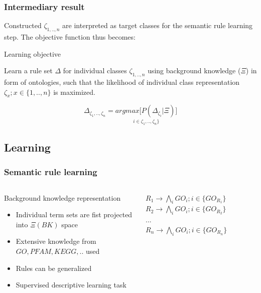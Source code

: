 \documentclass{beamer}
\begin{document}
\begin{frame}\frametitle{Intermediary result}

 Constructed $\zeta_{1,..,n}$  are interpreted as target classes for the semantic rule learning step. The objective function thus becomes:

  \begin{alertblock}{Learning objective}

    Learn a rule set $\Delta$  for individual classes $\zeta_{1,..,n}$ using background knowledge ($\Xi$) in form of ontologies, such that the likelihood of individual class representation $\zeta_{x};x \in \{1,..,n\}$ is maximized.

    \begin{equation}
      \Delta_{\zeta_{1},..,\zeta_{n}} = \underset{i \in \zeta_{1},..,\zeta_{n}\}}{argmax \Big[P(
        \Delta_{\zeta_{i}}|\Xi) \Big]}
    \end{equation}
    
    \end{alertblock}
  
  \end{frame}
  \subsection{Learning}
  \begin{frame}\frametitle{Semantic rule learning}

      \begin{columns}
    \begin{column}{0.5\textwidth}

  \begin{block}{Background knowledge representation}
    \begin{itemize}

    \item Individual term sets are fist projected into $\Xi(BK)$ space
    \item Extensive knowledge from $GO,PFAM, KEGG,..$ used
    \item Rules can be generalized
    \item Supervised descriptive learning task
      
    \end{itemize}
  \end{block}
      \end{column}
      \begin{column}{0.5\textwidth}  %
      \begin{center}
        $R_{1} \rightarrow \bigwedge_{i}GO_{i}; i \in \{GO_{R_{1}}\}$
        $R_{2} \rightarrow \bigwedge_{i}GO_{i}; i \in \{GO_{R_{2}}\}$\\
        $...$\\
        \medskip
        $R_{n} \rightarrow \bigwedge_{i}GO_{i}; i \in \{GO_{R_{n}}\}$
      \end{center}
    \end{column}
    \end{columns}

  \end{frame}
\end{document}
